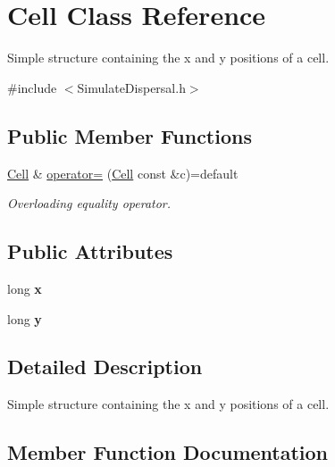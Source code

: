 \hypertarget{struct_cell}{}\section{Cell Class Reference}
\label{struct_cell}


Simple structure containing the x and y positions of a cell.  




{\ttfamily \#include $<$Simulate\+Dispersal.\+h$>$}

\subsection*{Public Member Functions}
\begin{DoxyCompactItemize}
\item 
\hyperlink{struct_cell}{Cell} \& \hyperlink{struct_cell_ac1f905d4cd626cc32963ab7a6f76634e}{operator=} (\hyperlink{struct_cell}{Cell} const \&c)=default
\begin{DoxyCompactList}\small\item\em Overloading equality operator. \end{DoxyCompactList}\end{DoxyCompactItemize}
\subsection*{Public Attributes}
\begin{DoxyCompactItemize}
\item 
long {\bfseries x}\hypertarget{struct_cell_a20ccaf4c7a18ce06930f961ed4fe3851}{}\label{struct_cell_a20ccaf4c7a18ce06930f961ed4fe3851}

\item 
long {\bfseries y}\hypertarget{struct_cell_a05aaf17f035c254584190b8ada505efc}{}\label{struct_cell_a05aaf17f035c254584190b8ada505efc}

\end{DoxyCompactItemize}


\subsection{Detailed Description}
Simple structure containing the x and y positions of a cell. 

\subsection{Member Function Documentation}
